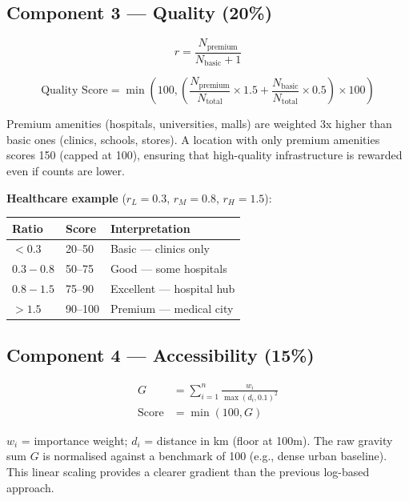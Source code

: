\documentclass[11pt,a4paper]{article}
\begin{document}
\subsection{Component 3 --- Quality (20\%)}

\begin{equation}
r = \frac{N_{\text{premium}}}{N_{\text{basic}} + 1}
\end{equation}

\begin{equation}
\text{Quality Score} = \min\left(100, \left( \frac{N_{\text{premium}}}{N_{\text{total}}} \times 1.5 + \frac{N_{\text{basic}}}{N_{\text{total}}} \times 0.5 \right) \times 100 \right)
\end{equation}

Premium amenities (hospitals, universities, malls) are weighted 3x higher than basic ones (clinics, schools, stores). A location with only premium amenities scores 150 (capped at 100), ensuring that high-quality infrastructure is rewarded even if counts are lower.

\textbf{Healthcare example} ($r_L=0.3$, $r_M=0.8$, $r_H=1.5$):

\begin{center}
\begin{tabular}{@{}lll@{}}
\toprule
\textbf{Ratio} & \textbf{Score} & \textbf{Interpretation} \\ \midrule
$< 0.3$    & 20--50  & Basic --- clinics only \\
$0.3-0.8$  & 50--75  & Good --- some hospitals \\
$0.8-1.5$  & 75--90  & Excellent --- hospital hub \\
$> 1.5$    & 90--100 & Premium --- medical city \\ \bottomrule
\end{tabular}
\end{center}

\subsection{Component 4 --- Accessibility (15\%)}

\begin{align}
G &= \sum_{i=1}^{n} \frac{w_i}{\max(d_i, 0.1)^2} \\[6pt]
\text{Score} &= \min\left(100, G \right)
\end{align}

$w_i$ = importance weight; $d_i$ = distance in km (floor at 100m).
The raw gravity sum $G$ is normalised against a benchmark of 100 (e.g., dense urban baseline). This linear scaling provides a clearer gradient than the previous log-based approach.
\end{document}
